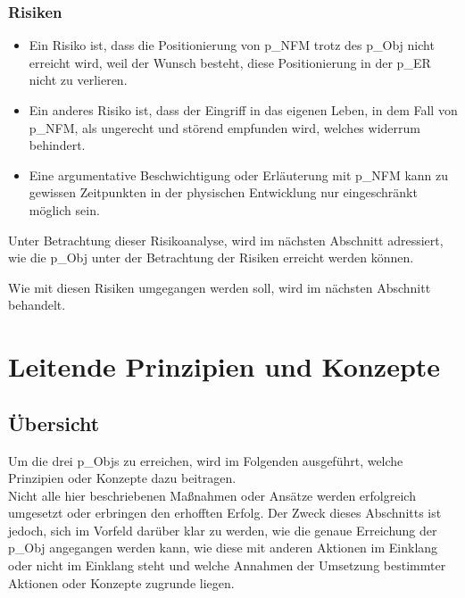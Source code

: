 \subsubsection{Risiken}
\begin{itemize}
	\item Ein Risiko ist, dass die Positionierung von \gls{p_NFM} trotz des \gls{p_Obj} nicht erreicht wird, weil der Wunsch besteht, diese Positionierung in der \gls{p_ER} nicht zu verlieren. 
	\item Ein anderes Risiko ist, dass der Eingriff in das eigenen Leben, in dem Fall von \gls{p_NFM}, als ungerecht und störend empfunden wird, welches widerrum \NFMOTwo behindert.
	\item Eine argumentative Beschwichtigung oder Erläuterung mit \gls{p_NFM} kann zu gewissen Zeitpunkten in der physischen Entwicklung nur eingeschränkt möglich sein.
\end{itemize}

Unter Betrachtung dieser Risikoanalyse, wird im nächsten Abschnitt adressiert, wie die \gls{p_Obj} unter der Betrachtung der Risiken erreicht werden können.

Wie mit diesen Risiken umgegangen werden soll, wird im nächsten Abschnitt behandelt.

\section{Leitende Prinzipien und Konzepte}\label{sec:Erreichung}
\subsection{Übersicht}
Um die drei \glspl{p_Obj} zu erreichen, wird im Folgenden ausgeführt, welche Prinzipien oder Konzepte dazu beitragen.\\


Nicht alle hier beschriebenen Maßnahmen oder Ansätze werden erfolgreich umgesetzt oder erbringen den erhofften Erfolg. Der Zweck dieses Abschnitts ist jedoch, sich im Vorfeld darüber klar zu werden, wie die genaue Erreichung der \gls{p_Obj} angegangen werden kann, wie diese mit anderen Aktionen im Einklang oder nicht im Einklang steht und welche Annahmen der Umsetzung bestimmter Aktionen oder Konzepte zugrunde liegen.\\



